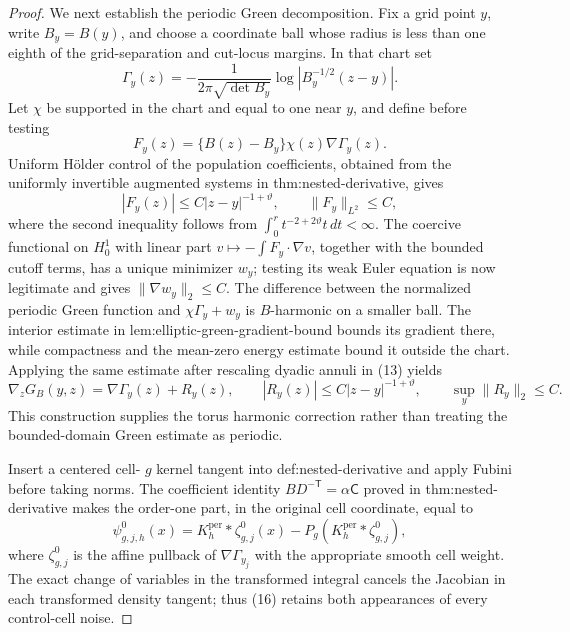 \documentclass{article}
\begin{document}
\begin{proof}
We next establish the periodic Green decomposition.  Fix a grid point \(y\), write \(B_y=B(y)\), and choose a coordinate ball whose radius is less than one eighth of the grid-separation and cut-locus margins.  In that chart set
\[
 \Gamma_y(z)=-\frac1{2\pi\sqrt{\det B_y}}
       \log\left|B_y^{-1/2}(z-y)\right|.
\tag{12}
\]
Let \(\chi\) be supported in the chart and equal to one near \(y\), and define before testing
\[
 F_y(z)=\{B(z)-B_y\}\chi(z)\nabla\Gamma_y(z).
\tag{13}
\]
Uniform H\"older control of the population coefficients, obtained from the uniformly invertible augmented systems in thm:nested-derivative, gives
\[
 |F_y(z)|\leq C|z-y|^{-1+\vartheta},
 \qquad \|F_y\|_{L^2}\leq C,
\tag{14}
\]
where the second inequality follows from
\(\int_0^r t^{-2+2\vartheta}t\,dt<\infty\).  The coercive functional on
\(H_0^1\) with linear part \(v\mapsto-\int F_y\cdot\nabla v\), together with the bounded cutoff terms, has a unique minimizer \(w_y\); testing its weak Euler equation is now legitimate and gives
\(\|\nabla w_y\|_2\leq C\).  The difference between the normalized periodic Green function and
\(\chi\Gamma_y+w_y\) is \(B\)-harmonic on a smaller ball.  The interior estimate in lem:elliptic-green-gradient-bound bounds its gradient there, while compactness and the mean-zero energy estimate bound it outside the chart.  Applying the same estimate after rescaling dyadic annuli in (13) yields
\[
 \nabla_zG_B(y,z)=\nabla\Gamma_y(z)+R_y(z),
 \qquad |R_y(z)|\leq C|z-y|^{-1+\vartheta},
 \qquad \sup_y\|R_y\|_2\leq C.
\tag{15}
\]
This construction supplies the torus harmonic correction rather than treating the bounded-domain Green estimate as periodic.

Insert a centered cell-
\(g\) kernel tangent into def:nested-derivative and apply Fubini before taking norms.  The coefficient identity
\(BD^{-\mathsf T}=\alpha\mathsf C\) proved in thm:nested-derivative makes the order-one part, in the original cell coordinate, equal to
\[
 \psi^0_{g,j,h}(x)
 =K_h^{\mathrm{per}}*\zeta^0_{g,j}(x)
   -P_g(K_h^{\mathrm{per}}*\zeta^0_{g,j}),
\tag{16}
\]
where \(\zeta^0_{g,j}\) is the affine pullback of \(\nabla\Gamma_{y_j}\) with the appropriate smooth cell weight.  The exact change of variables in the transformed integral cancels the Jacobian in each transformed density tangent; thus (16) retains both appearances of every control-cell noise.


\end{proof}
\end{document}
